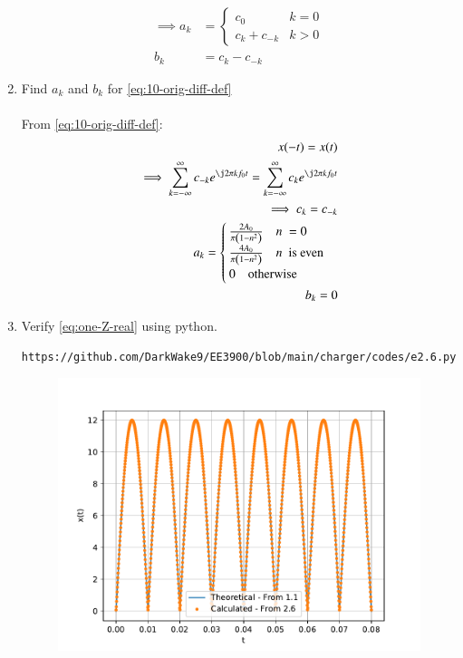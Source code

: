 \documentclass[journal,12pt,twocolumn]{IEEEtran}
\renewcommand\thesection{\arabic{section}}
\begin{document}
\begin{enumerate}[label=\thesection.\arabic*,ref=\thesection.\theenumi]
\begin{align}
	\implies
	a_k &= 
	\begin{cases}
		c_0 & k = 0 \\
		c_k + c_{-k} & k > 0
	\end{cases} \label{eq:ak} \\
	b_k &= c_k - c_{-k}
	\label{eq:bk}
\end{align}
\item Find $a_k$ and $b_k$ for 
\eqref{eq:10-orig-diff-def}\\
\solution\\
From \eqref{eq:10-orig-diff-def}:
\begin{align}
	x(-t) = x(t)\\
	\implies \sum_{k = -\infty}^{\infty}c_{-k}e^{\j2\pi kf_0t}
	= \sum_{k = -\infty}^{\infty}c_ke^{\j2\pi kf_0 t}\\
	\implies c_k = c_{-k}\\
	a_k = \begin{cases}
		\frac{2A_0}{\pi\brak{1-n^2}} \quad n\ = 0\\
		\frac{4A_0}{\pi\brak{1-n^2}} \quad n\ \text{ is even}\\
		0 \quad \text{otherwise}
	\end{cases}\\
	b_k = 0
\end{align}
\item Verify 
\eqref{eq:one-Z-real}
using python.
\begin{lstlisting}
https://github.com/DarkWake9/EE3900/blob/main/charger/codes/e2.6.py
\end{lstlisting}
\begin{figure}[!ht]
	\begin{center}
		\includegraphics[width=\columnwidth]{./figs/e2.6.pdf}
	\end{center}
	\label{fig:ft}	
\end{figure}
\end{enumerate}
\end{document}
